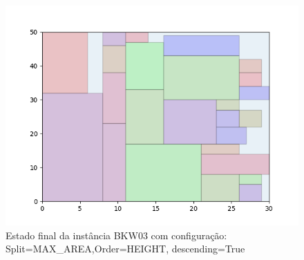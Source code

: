 \begin{figure}[H]
    \centering
    \caption[]{Estado final da instância BKW03 com configuração: Split=MAX_AREA,Order=HEIGHT, descending=True}
    \label{fig:bkw03-max_area-height-true}
    \includegraphics[scale=0.5]{output/figures/bkw/bkw03/max_area/height/true/00}
\end{figure}